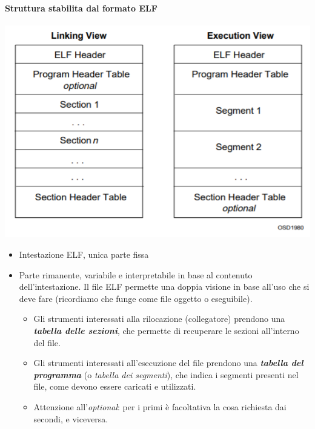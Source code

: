 \documentclass[11pt]{report}
\theoremstyle{definition}
\begin{document}
\paragraph{Struttura stabilita dal formato ELF}\begin{center}
\includegraphics[scale=0.8]{img/52.PNG}
\end{center}  
\begin{itemize}
\item Intestazione ELF, unica parte fissa 
\item Parte rimanente, variabile e interpretabile in base al contenuto dell'intestazione. Il file ELF permette una doppia visione in base all'uso che si deve fare (ricordiamo che funge come file oggetto o eseguibile).
\begin{itemize}
\item Gli strumenti interessati alla rilocazione (collegatore) prendono una \textbf{\emph{tabella delle sezioni}}, che permette di recuperare le sezioni all'interno del file.
\item Gli strumenti interessati all'esecuzione del file prendono una \textbf{\emph{tabella del programma}} (o \emph{tabella dei segmenti}), che indica i segmenti presenti nel file, come devono essere caricati e utilizzati.
\item Attenzione all'\emph{optional}: per i primi è facoltativa la cosa richiesta dai secondi, e viceversa.
\end{itemize}
\end{itemize}
\end{document}
